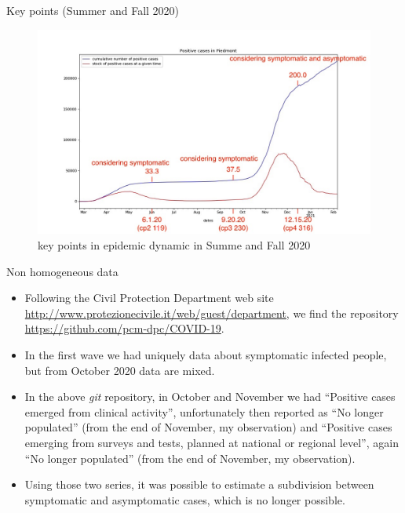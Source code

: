\documentclass[9pt]{beamer}
\begin{document}
\begin{frame}{Key points (Summer and Fall 2020)}

\begin{figure}[H]
\center
\includegraphics[scale=0.25]{andamento900annotato.jpg}
\caption{key points in epidemic dynamic in Summe and Fall 2020} 
\label{Key points}
\end{figure}


\end{frame}

\begin{frame}{Non homogeneous data}

\begin{itemize}

\item Following the Civil Protection Department web site \url{http://www.protezionecivile.it/web/guest/department}, we find the
 repository \url{https://github.com/pcm-dpc/COVID-19}.
 
 \item In the first wave we had uniquely data about symptomatic infected people, but from October 2020 data are mixed.
 
 \item In the above \emph{git}  repository, in October and November we had ``Positive cases emerged from clinical activity'', unfortunately then reported as ``No longer populated'' (from the end of November, my observation) and ``Positive cases emerging from surveys and tests, planned at national or regional level'', again ``No longer populated'' (from the end of November, my observation).
 
 \item Using those two series, it was possible to estimate a subdivision between symptomatic and asymptomatic cases, which is no longer possible.
 
\end{itemize}

\end{frame}
\end{document}
